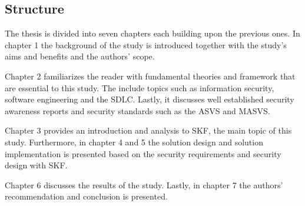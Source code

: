 \subsection{Structure}
The thesis is divided into seven chapters each building upon the previous ones. In chapter 1 the background of the study is introduced together with the study's aims and benefits and the authors' scope.

Chapter 2 familiarizes the reader with fundamental theories and framework that are essential to this study. The include topics such as information security, software engineering and the SDLC. Lastly, it discusses well established security awareness reports and security standards such as the ASVS and MASVS.

Chapter 3 provides an introduction and analysis to SKF, the main topic of this study. Furthermore, in chapter 4 and 5 the solution design and solution implementation is presented based on the security requirements and security design with SKF. 

Chapter 6 discusses the results of the study. Lastly, in chapter 7 the authors' recommendation and conclusion is presented.
